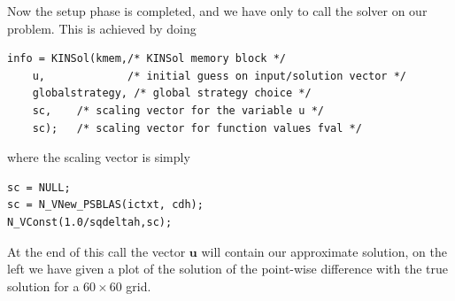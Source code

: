 \documentclass[twoside,a4paper]{refart}
\theoremstyle{definition}
\begin{document}
Now the setup phase is completed, and we have only to call the solver on our problem. This is achieved by doing
\begin{lstlisting}[style=CStyle]
info = KINSol(kmem,/* KINSol memory block */
	u,             /* initial guess on input/solution vector */
	globalstrategy, /* global strategy choice */
	sc,    /* scaling vector for the variable u */
	sc);   /* scaling vector for function values fval */
\end{lstlisting}
where the scaling vector is simply
\begin{lstlisting}[style=CStyle]
sc = NULL;
sc = N_VNew_PSBLAS(ictxt, cdh);
N_VConst(1.0/sqdeltah,sc);
\end{lstlisting}
At the end of this call the vector $\mathbf{u}$ will contain our approximate solution, on the left we have given a plot of the solution of the point-wise difference with the true solution for a $60\times 60$ grid.
\end{document}
